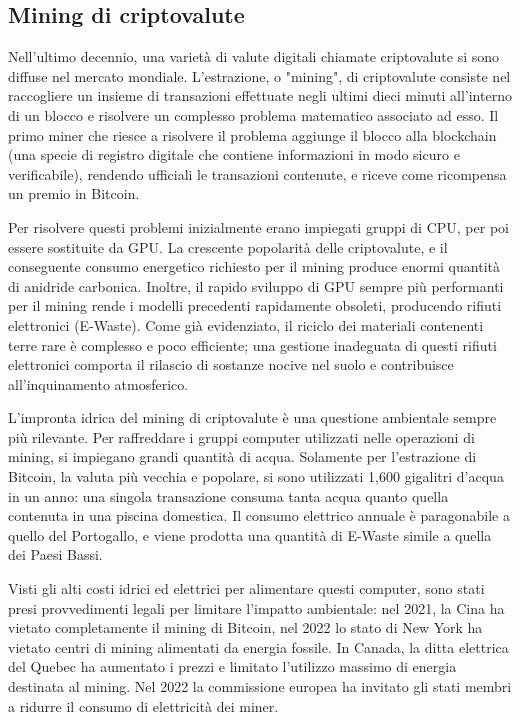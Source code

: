 \documentclass[12pt,a4paper,oneside]{book}
\begin{document}
\subsection{Mining di criptovalute}

Nell'ultimo decennio, una varietà di valute digitali chiamate criptovalute si sono diffuse nel mercato mondiale. L'estrazione, o "mining", di criptovalute consiste nel raccogliere un insieme di transazioni effettuate negli ultimi dieci minuti all'interno di un blocco e risolvere un complesso problema matematico associato ad esso. Il primo miner che riesce a risolvere il problema aggiunge il blocco alla blockchain (una specie di registro digitale che contiene informazioni in modo sicuro e verificabile), rendendo ufficiali le transazioni contenute, e riceve come ricompensa un premio in Bitcoin.

Per risolvere questi problemi inizialmente erano impiegati gruppi di CPU, per poi essere sostituite da GPU. La crescente popolarità delle criptovalute, e il conseguente consumo energetico richiesto per il mining produce enormi quantità di anidride carbonica. Inoltre, il rapido sviluppo di GPU sempre più performanti per il mining rende i modelli precedenti rapidamente obsoleti, producendo rifiuti elettronici (E-Waste). Come già evidenziato, il riciclo dei materiali contenenti terre rare è complesso e poco efficiente; una gestione inadeguata di questi rifiuti elettronici comporta il rilascio di sostanze nocive nel suolo e contribuisce all'inquinamento atmosferico.

L'impronta idrica del mining di criptovalute è una questione ambientale sempre più rilevante. Per raffreddare i gruppi computer utilizzati nelle operazioni di mining, si impiegano grandi quantità di acqua. Solamente per l'estrazione di Bitcoin, la valuta più vecchia e popolare, si sono utilizzati 1,600 gigalitri d'acqua in un anno: una singola transazione consuma tanta acqua quanto quella contenuta in una piscina domestica. Il consumo elettrico annuale è paragonabile a quello del Portogallo, e viene prodotta una quantità di E-Waste simile a quella dei Paesi Bassi.

Visti gli alti costi idrici ed elettrici per alimentare questi computer, sono stati presi provvedimenti legali per limitare l'impatto ambientale: nel 2021, la Cina ha vietato completamente il mining di Bitcoin, nel 2022 lo stato di New York ha vietato centri di mining alimentati da energia fossile. In Canada, la ditta elettrica del Quebec ha aumentato i prezzi e limitato l'utilizzo massimo di energia destinata al mining. Nel 2022 la commissione europea ha invitato gli stati membri a ridurre il consumo di elettricità dei miner.
\end{document}
